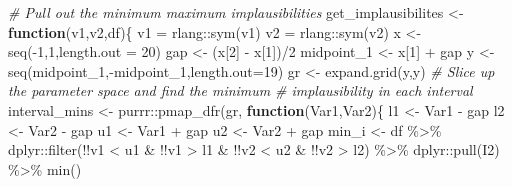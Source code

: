 \documentclass[
  12pt,
  a4paper,
  twoside]{book}
\newenvironment{Shaded}{\begin{snugshade}}{\end{snugshade}}
\newcommand{\AttributeTok}[1]{\textcolor[rgb]{0.77,0.63,0.00}{#1}}
\newcommand{\CommentTok}[1]{\textcolor[rgb]{0.56,0.35,0.01}{\textit{#1}}}
\newcommand{\ControlFlowTok}[1]{\textcolor[rgb]{0.13,0.29,0.53}{\textbf{#1}}}
\newcommand{\DecValTok}[1]{\textcolor[rgb]{0.00,0.00,0.81}{#1}}
\newcommand{\FunctionTok}[1]{\textcolor[rgb]{0.00,0.00,0.00}{#1}}
\newcommand{\NormalTok}[1]{#1}
\newcommand{\OtherTok}[1]{\textcolor[rgb]{0.56,0.35,0.01}{#1}}
\newcommand{\SpecialCharTok}[1]{\textcolor[rgb]{0.00,0.00,0.00}{#1}}
\begin{document}
\begin{Shaded}
\begin{Highlighting}[]
\CommentTok{\# Pull out the minimum maximum implausibilities}
\NormalTok{get\_implausibilites }\OtherTok{\textless{}{-}} \ControlFlowTok{function}\NormalTok{(v1,v2,df)\{}
\NormalTok{  v1 }\OtherTok{=}\NormalTok{ rlang}\SpecialCharTok{::}\FunctionTok{sym}\NormalTok{(v1)}
\NormalTok{  v2 }\OtherTok{=}\NormalTok{ rlang}\SpecialCharTok{::}\FunctionTok{sym}\NormalTok{(v2)}
\NormalTok{  x }\OtherTok{\textless{}{-}} \FunctionTok{seq}\NormalTok{(}\SpecialCharTok{{-}}\DecValTok{1}\NormalTok{,}\DecValTok{1}\NormalTok{,}\AttributeTok{length.out =} \DecValTok{20}\NormalTok{)}
\NormalTok{  gap }\OtherTok{\textless{}{-}}\NormalTok{ (x[}\DecValTok{2}\NormalTok{] }\SpecialCharTok{{-}}\NormalTok{ x[}\DecValTok{1}\NormalTok{])}\SpecialCharTok{/}\DecValTok{2}
\NormalTok{  midpoint\_1 }\OtherTok{\textless{}{-}}\NormalTok{ x[}\DecValTok{1}\NormalTok{] }\SpecialCharTok{+}\NormalTok{ gap}
\NormalTok{  y }\OtherTok{\textless{}{-}} \FunctionTok{seq}\NormalTok{(midpoint\_1,}\SpecialCharTok{{-}}\NormalTok{midpoint\_1,}\AttributeTok{length.out=}\DecValTok{19}\NormalTok{)}
\NormalTok{  gr }\OtherTok{\textless{}{-}} \FunctionTok{expand.grid}\NormalTok{(y,y)}
  \CommentTok{\# Slice up the parameter space and find the minimum}
  \CommentTok{\# implausibility in each interval}
\NormalTok{  interval\_mins }\OtherTok{\textless{}{-}}\NormalTok{ purrr}\SpecialCharTok{::}\FunctionTok{pmap\_dfr}\NormalTok{(gr, }\ControlFlowTok{function}\NormalTok{(Var1,Var2)\{}
\NormalTok{    l1 }\OtherTok{\textless{}{-}}\NormalTok{ Var1 }\SpecialCharTok{{-}}\NormalTok{ gap}
\NormalTok{    l2 }\OtherTok{\textless{}{-}}\NormalTok{ Var2 }\SpecialCharTok{{-}}\NormalTok{ gap}
\NormalTok{    u1 }\OtherTok{\textless{}{-}}\NormalTok{ Var1 }\SpecialCharTok{+}\NormalTok{ gap}
\NormalTok{    u2 }\OtherTok{\textless{}{-}}\NormalTok{ Var2 }\SpecialCharTok{+}\NormalTok{ gap}
\NormalTok{    min\_i }\OtherTok{\textless{}{-}}\NormalTok{ df }\SpecialCharTok{\%\textgreater{}\%}\NormalTok{ dplyr}\SpecialCharTok{::}\FunctionTok{filter}\NormalTok{(}\SpecialCharTok{!!}\NormalTok{v1 }\SpecialCharTok{\textless{}}\NormalTok{ u1 }\SpecialCharTok{\&} \SpecialCharTok{!!}\NormalTok{v1 }\SpecialCharTok{\textgreater{}}\NormalTok{ l1 }\SpecialCharTok{\&}
                                    \SpecialCharTok{!!}\NormalTok{v2 }\SpecialCharTok{\textless{}}\NormalTok{ u2 }\SpecialCharTok{\&} \SpecialCharTok{!!}\NormalTok{v2 }\SpecialCharTok{\textgreater{}}\NormalTok{ l2) }\SpecialCharTok{\%\textgreater{}\%}
\NormalTok{      dplyr}\SpecialCharTok{::}\FunctionTok{pull}\NormalTok{(I2) }\SpecialCharTok{\%\textgreater{}\%} \FunctionTok{min}\NormalTok{()}

\end{Highlighting}
\end{Shaded}
\end{document}
